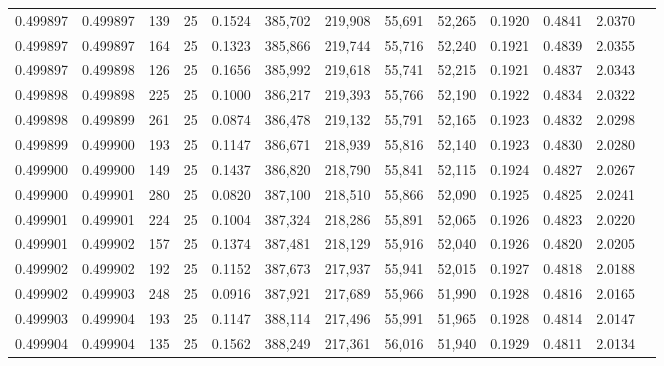\begin{tabular}{rrrrrrrrrrrrr}
0.499897 & 0.499897 & 139 &  25 &                                     0.1524 & 385,702 & 219,908 &  55,691 &  52,265 & 0.1920 & 0.4841 & 2.0370 \\
0.499897 & 0.499897 & 164 &  25 &                                     0.1323 & 385,866 & 219,744 &  55,716 &  52,240 & 0.1921 & 0.4839 & 2.0355 \\
0.499897 & 0.499898 & 126 &  25 &                                     0.1656 & 385,992 & 219,618 &  55,741 &  52,215 & 0.1921 & 0.4837 & 2.0343 \\
0.499898 & 0.499898 & 225 &  25 &                                     0.1000 & 386,217 & 219,393 &  55,766 &  52,190 & 0.1922 & 0.4834 & 2.0322 \\
0.499898 & 0.499899 & 261 &  25 &                                     0.0874 & 386,478 & 219,132 &  55,791 &  52,165 & 0.1923 & 0.4832 & 2.0298 \\
0.499899 & 0.499900 & 193 &  25 &                                     0.1147 & 386,671 & 218,939 &  55,816 &  52,140 & 0.1923 & 0.4830 & 2.0280 \\
0.499900 & 0.499900 & 149 &  25 &                                     0.1437 & 386,820 & 218,790 &  55,841 &  52,115 & 0.1924 & 0.4827 & 2.0267 \\
0.499900 & 0.499901 & 280 &  25 &                                     0.0820 & 387,100 & 218,510 &  55,866 &  52,090 & 0.1925 & 0.4825 & 2.0241 \\
0.499901 & 0.499901 & 224 &  25 &                                     0.1004 & 387,324 & 218,286 &  55,891 &  52,065 & 0.1926 & 0.4823 & 2.0220 \\
0.499901 & 0.499902 & 157 &  25 &                                     0.1374 & 387,481 & 218,129 &  55,916 &  52,040 & 0.1926 & 0.4820 & 2.0205 \\
0.499902 & 0.499902 & 192 &  25 &                                     0.1152 & 387,673 & 217,937 &  55,941 &  52,015 & 0.1927 & 0.4818 & 2.0188 \\
0.499902 & 0.499903 & 248 &  25 &                                     0.0916 & 387,921 & 217,689 &  55,966 &  51,990 & 0.1928 & 0.4816 & 2.0165 \\
0.499903 & 0.499904 & 193 &  25 &                                     0.1147 & 388,114 & 217,496 &  55,991 &  51,965 & 0.1928 & 0.4814 & 2.0147 \\
0.499904 & 0.499904 & 135 &  25 &                                     0.1562 & 388,249 & 217,361 &  56,016 &  51,940 & 0.1929 & 0.4811 & 2.0134 \\

\end{tabular}
